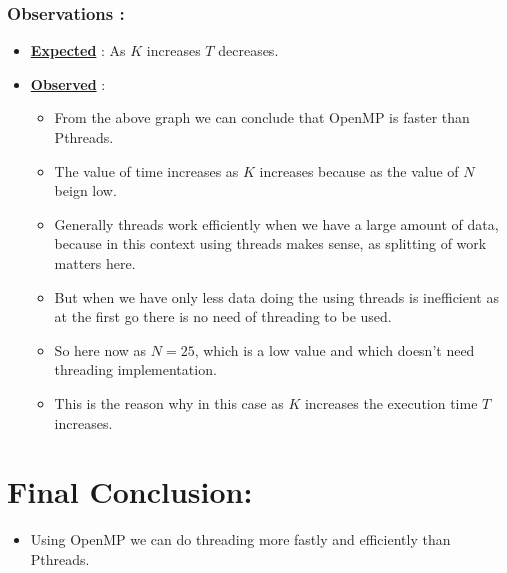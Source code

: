 \documentclass[12pt,a4paper]{article}
\begin{document}
	\subsubsection{Observations :} 
	\begin{itemize}
		\item \underline{\textbf{Expected}} : As $K$ increases $T$ decreases.
		\item \underline{\textbf{Observed}} : 
		\begin{itemize}
			\item  From the above graph we can conclude that OpenMP is faster than Pthreads.
			\item The value of time increases as $K$ increases because as the value of $N$ beign low.
			\item Generally threads work efficiently when we have a large amount of data, because in this context using threads makes sense, as splitting of work matters here.
			\item But when we have only less data doing the using threads is inefficient as at the first go there is no need of threading to be used.
			\item So here now as $N=25$, which is a low value and which doesn't need threading implementation.
			\item This is the reason why in this case as $K$ increases the execution time $T$ increases. 
		\end{itemize}
	\end{itemize}  		
		\section{ Final Conclusion:} 
		\begin{itemize}
			\item Using OpenMP we can do threading more fastly and efficiently than Pthreads.
		\end{itemize}
\end{document}

